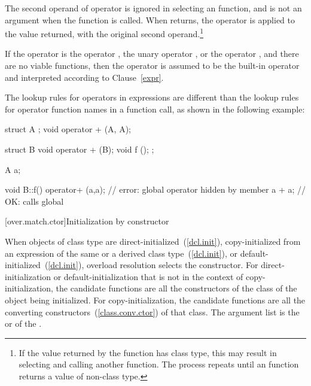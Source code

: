 \pnum
The second operand of operator
\tcode{->}
is ignored in selecting an
function, and is not an argument when the
function is called.
When
returns, the operator
\tcode{->}
is applied to the value returned, with the original second
operand.\footnote{If the value returned by the
function has class type, this may result in selecting and calling another
function.
The process repeats until an
function returns a value of non-class type.}

\pnum
If the operator is the operator
\tcode{,},
the unary operator
\tcode{\&},
or the operator
\tcode{->},
and there are no viable functions, then the operator is
assumed to be the built-in operator and interpreted according to
Clause~\ref{expr}.

\pnum
\begin{note}
The lookup rules for operators in expressions are different than
the lookup
rules for operator function names in a function call, as shown in the following
example:

\begin{codeblock}
struct A { };
void operator + (A, A);

struct B {
  void operator + (B);
  void f ();
};

A a;

void B::f() {
  operator+ (a,a);              // error: global operator hidden by member
  a + a;                        // OK: calls global 
}
\end{codeblock}
\end{note}

[over.match.ctor]{Initialization by constructor}%

\pnum
When objects of class type are direct-initialized~(\ref{dcl.init}),
copy-initialized from an expression of the same or a
derived class type~(\ref{dcl.init}),
or default-initialized~(\ref{dcl.init}),
overload resolution selects the constructor.
For direct-initialization or default-initialization
that is not in the context of copy-initialization, the
candidate functions are
all the constructors of the class of the object being
initialized.
For copy-initialization, the candidate functions are all
the converting constructors~(\ref{class.conv.ctor}) of that
class.
The argument list is the
 or 
of the .

